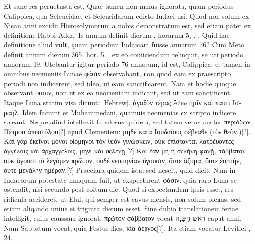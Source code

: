 Et sane res peruetusta est.
Quae tamen
non minus ignorata, quam periodus Calippica, qua Seleucidae, et
Seleucidarum edicto Iudaei usi.
Quod non solum ex Nisan anni excidii
Hierosolymorum a nobis demonstratum est, sed etiam patet
ex definitione Rabbi Adda.
Is annum definit dierum ,
horarum 5, . .
Quid hac definitione aliud vult, quam periodum
Iudaicam fuisse annorum 76?
Cum Meto definit annum dierum
365. hor. 5. . ex eo coniiciendum relinquit,
 se uti periodo annorum
19.
Utebantur igitur periodo 76 annorum, id est, Calippica:
et tamen in omnibus neomeniis Lunae \textgreek{φάσιν} observabant, non
quod eam ex praescripto periodi non indicerent, sed ideo, ut eam
sanctificarent.
Nam et hodie quoque observant \textgreek{φάσιν}, non ut ex ea
neomeniam indicant, sed ut eam sanctificent.
Itaque Luna statim
visa dicunt: \texthebrew{}[Hebrew].
\textgreek{ἀγαθὸν τέρας ἔστω ἡμῖν καὶ παυτὶ Ισραήλ.}
Idem faciunt et Muhammedani, quamuis neomenias ex
scripto indicere soleant.
Neque aliud intellexit fabulosus quidem,
sed tatem vetus auctor \textgreek{περιόδῳν Πέτρου ἀποστόλου[?]} apud Clementem:
\textgreek{μηδὲ κατα Ιουδαίους σἔβεαθε (τὸν θεὸν.)[?]}.
\textgreek{Καὶ γὰρ ἐκεῖνοι μόνοι οἰόμηνοι τὸν θεὸν
γινώσκειν, οὐκ ἐπίστανται λατρέυοντες ἀγγέλοις κὰι ἀρχαγγελοις, μηνὶ κὰι σελένῃ.[?]}
\textgreek{Καὶ ἐὰν μὴ ἡ σελήνη φανῇ,
 σάββατον οὐκ ἄγουσι τὸ λεγόμεν πρῶτον, ὀυδὲ νεομηνίαν
ἄγουσιν, ὄυτε ἄζυμα, ὄυτε έορτὴν, ὄυτε μεγάλην ἡμέραν.[?]}
Praeclara quidem ista: sed nescit, quid dicit.
%
Nam in Iudaeorum potestate
nunquam fuit, ut exspectarent \textgreek{φάσιν}:
 quia raro Luna se ostendit,
nisi secundo post coitum die.
Quod si expectandum ipsis esset,
res ridicula accideret, ut Elul, qui semper est cavus mensis, non solum
plenus, sed etiam aliqando unius et triginta dierum esset.
Sine dubio translationem feriae intelligit, cuius caussam ignorat.
\textgreek{πρῶτον σάββατον} vocat
 \texthebrew{רֹאשׁ הַשָּׁנָה‎}
 caput anni.
Nam Sabbatum vocat, quia Festus
dies, \textgreek{κὶα ἀεργός}[?].
Ita etiam vocatur Levitici , 24.

